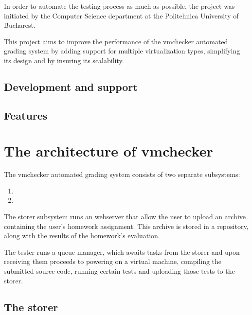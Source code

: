 In order to automate the testing process as much as possible, the \project project 
was initiated by the Computer Science department at the Politehnica 
University of Bucharest.

This project aims to improve the performance of the vmchecker automated grading
system by adding support for multiple virtualization types, simplifying its
design and by insuring its scalability.

\subsection{Development and support}
\label{sub-sec:vmc-history-dev}


\subsection{Features}
\label{sub-sec:vmc-history-features}


\section{The architecture of vmchecker}
\label{sec:vmc-architecture}

The vmchecker automated grading system consists of two separate subsystems:
\begin{enumerate}
\item {}
\item {}
\end{enumerate}

\begin{center}
\end{center}

The storer subsystem runs an webserver that allow the user to upload an archive
containing the user's homework assignment. This archive is stored in a repository,
along with the results of the homework's evaluation.

The tester runs a queue manager, which awaits tasks from the storer and upon
receiving them proceeds to powering on a virtual machine, compiling the submitted
source code, running certain tests and uploading those tests to the storer.



\subsection{The storer}
\label{sub-sec:storer}


